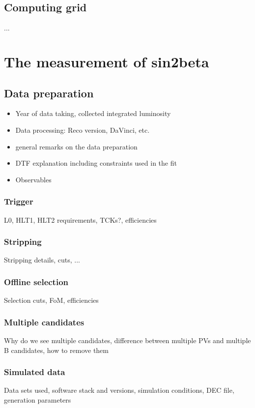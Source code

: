 \section{Computing grid}
...

\chapter{The measurement of sin2beta}
\section{Data preparation}
\begin{itemize}
  \item Year of data taking, collected integrated luminosity
  \item Data processing: Reco version, DaVinci, etc.
  \item general remarks on the data preparation
  \item DTF explanation including constraints used in the fit
  \item Observables
\end{itemize}

\subsection{Trigger}
L0, HLT1, HLT2 requirements, TCKs?, efficiencies

\subsection{Stripping}
Stripping details, cuts, ...

\subsection{Offline selection}
Selection cuts, FoM, efficiencies

\subsection{Multiple candidates}
Why do we see multiple candidates, difference between multiple PVs and multiple B candidates, how to remove them

\subsection{Simulated data}
Data sets used, software stack and versions, simulation conditions, DEC file, generation parameters

